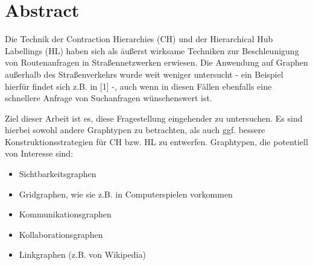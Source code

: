 \chapter{Abstract}
Die Technik der Contraction Hierarchies (CH) und der Hierarchical Hub Labellings (HL) haben sich als äußerst wirksame Techniken zur Beschleunigung von Routenanfragen in Straßennetzwerken erwiesen. Die Anwendung auf Graphen außerhalb des Straßenverkehrs wurde weit weniger untersucht - ein Beispiel hierfür findet sich z.B. in [1] -, auch wenn in diesen Fällen ebenfalls eine schnellere Anfrage von Suchanfragen wünschenswert ist.

Ziel dieser Arbeit ist es, diese Fragestellung eingehender zu untersuchen. Es sind hierbei sowohl andere Graphtypen zu betrachten, als auch ggf. bessere Konstruktionsstrategien für CH bzw. HL zu entwerfen. Graphtypen, die potentiell von Interesse sind:

\begin{itemize}
    \item
          Sichtbarkeitsgraphen
    \item
          Gridgraphen, wie sie z.B. in Computerspielen vorkommen
    \item
          Kommunikationsgraphen
    \item
          Kollaborationsgraphen
    \item
          Linkgraphen (z.B. von Wikipedia)
\end{itemize}